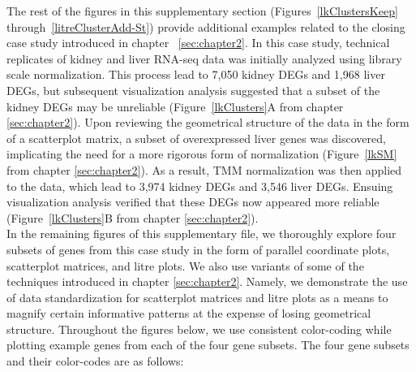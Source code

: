 \documentclass[11pt,a4paper,oldfontcommands,openany]{memoir}
\numberwithin{equation}{section} %
\begin{document}
\clearpage
The rest of the figures in this supplementary section (Figures~\ref{lkClustersKeep} through~\ref{litreClusterAdd-St}) provide additional examples related to the closing case study introduced in chapter ~\ref{sec:chapter2}. In this case study, technical replicates of kidney and liver RNA-seq data was initially analyzed using library scale normalization. This process lead to 7,050 kidney DEGs and 1,968 liver DEGs, but subsequent visualization analysis suggested that a subset of the kidney DEGs may be unreliable (Figure~\ref{lkClusters}A from chapter \ref{sec:chapter2}). Upon reviewing the geometrical structure of the data in the form of a scatterplot matrix, a subset of overexpressed liver genes was discovered, implicating the need for a more rigorous form of normalization (Figure~\ref{lkSM} from chapter \ref{sec:chapter2}). As a result, TMM normalization was then applied to the data, which lead to 3,974 kidney DEGs and 3,546 liver DEGs. Ensuing visualization analysis verified that these DEGs now appeared more reliable (Figure~\ref{lkClusters}B from chapter \ref{sec:chapter2}). \\

In the remaining figures of this supplementary file, we thoroughly explore four subsets of genes from this case study in the form of parallel coordinate plots, scatterplot matrices, and litre plots. We also use variants of some of the techniques introduced in chapter \ref{sec:chapter2}. Namely, we demonstrate the use of data standardization for scatterplot matrices and litre plots as a means to magnify certain informative patterns at the expense of losing geometrical structure. Throughout the figures below, we use consistent color-coding while plotting example genes from each of the four gene subsets. The four gene subsets and their color-codes are as follows:
\end{document}
